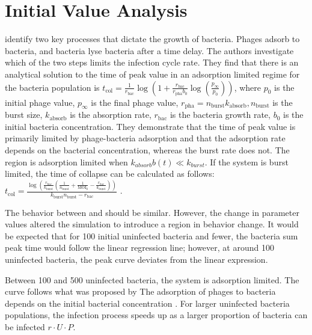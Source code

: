\section{Initial Value Analysis}
\citet{mullaExtremeDiversityPhage2024} identify two key processes that dictate the growth of bacteria. 
Phages adsorb to bacteria, and bacteria lyse bacteria after a time delay. 
The authors investigate which of the two steps limits the infection cycle rate. 
They find that there is an analytical solution to the time of peak value in an adsorption limited regime for the bacteria population is $t_{\text{col}} = \frac{1}{r_{\text{bac}}} \log\left(1 + \frac{r_{\text{bac}}}{r_{\text{pha}}b_0} \log\left(\frac{p_{\infty}}{p_0}\right)\right)$, where $p_0$ is the initial phage value, $p_\infty$ is the final phage value, $r_{\text{pha}} = n_{\text{burst}} k_{\text{absorb}}, n_{\text{burst}}$ is the burst size, $k_{\text{absorb}}$ is the absorption rate, $r_{\text{bac}}$ is the bacteria growth rate, $b_0$ is the initial bacteria concentration. 
They demonstrate that the time of peak value is primarily limited by phage-bacteria adsorption and that the adsorption rate depends on the bacterial concentration, whereas the burst rate does not. 
The region is adsorption limited when $k_{absorb}b(t) \ll k_{burst}$. 
If the system is burst limited, the time of collapse can be calculated as follows: $t_{\text{col}} = \frac{\log\left(\frac{r_{\text{bac}}}{k_{\text{burst}}}\left(\frac{1}{n_{\text{burst}}} + \frac{1}{\text{MOI}_0} - \frac{r_{\text{bac}}}{k_{\text{burst}}}\right)\right)}{k_{\text{burst}}n_{\text{burst}} - r_{\text{bac}}}$ \cite{mullaExtremeDiversityPhage2024}. 

The behavior between  and  should be similar. However, the change in parameter values altered the simulation to introduce a region in behavior change. 
It would be expected that for 100 initial uninfected bacteria and fewer, the bacteria sum peak time would follow the linear regression line; however, at around 100 uninfected bacteria, the peak curve deviates from the linear expression. 

Between 100 and 500 uninfected bacteria, the system is adsorption limited.
The curve follows what was proposed by \citet{mullaExtremeDiversityPhage2024} 
The adsorption of phages to bacteria depends on the initial bacterial concentration \cite{mullaExtremeDiversityPhage2024}. 
For larger uninfected bacteria populations, the infection process speeds up as a larger proportion of bacteria can be infected $r\cdot U\cdot P$. 

